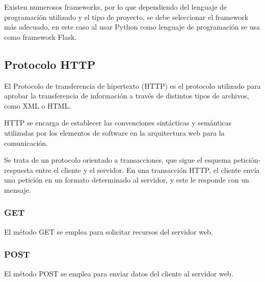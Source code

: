Existen numerosos frameworks, por lo que dependiendo del lenguaje de programación utilizado y el tipo de proyecto, se debe seleccionar el framework más adecuado, en este caso al usar Python como lenguaje de programación se usa como framework Flask.

\subsection{Protocolo HTTP}
\cite{http} El Protocolo de transferencia de hipertexto (HTTP) es el protocolo utilizado para aprobar la transferencia de información a través de distintos tipos de archivos, como XML o HTML.

HTTP se encarga de establecer las convenciones sintácticas y semánticas utilizadas por los elementos de software en la arquitectura web para la comunicación. 

Se trata de un protocolo orientado a transacciones, que sigue el esquema petición-respuesta entre el cliente y el servidor. En una transacción HTTP, el cliente envía una petición en un formato determinado al servidor, y este le responde con un mensaje.


\subsubsection{GET}
\cite{getypost} El método GET se emplea para solicitar recursos del servidor web.

\subsubsection{POST}
\cite{getypost} El método POST se emplea para enviar datos del cliente al servidor web.

